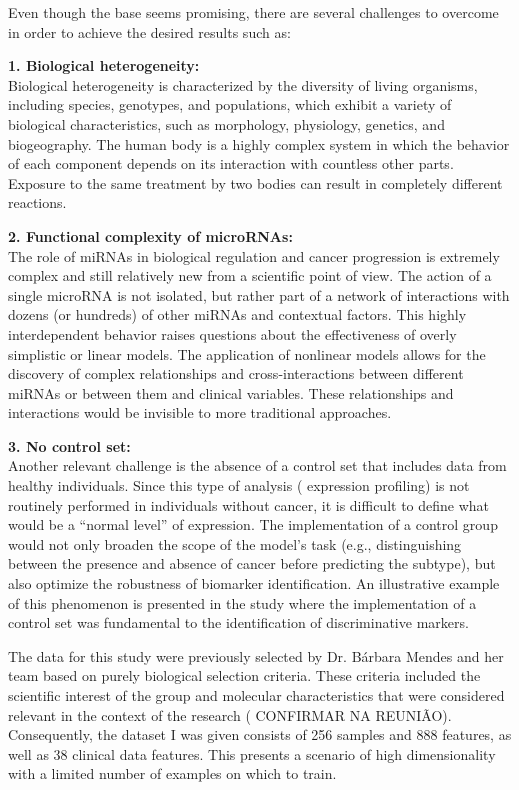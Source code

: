 Even though the base seems promising, there are several challenges to overcome
in order to achieve the desired results such as:

\textbf{1. Biological heterogeneity:} \\
\label{sec:biological-heterogeneity}
Biological heterogeneity is characterized by the diversity of living organisms,
including species, genotypes, and populations, which exhibit a variety of
biological characteristics, such as morphology, physiology, genetics, and biogeography.
The human body is a highly complex system in which the behavior of each
component depends on its interaction with countless other parts.
Exposure to the same treatment by two bodies can result in completely different
reactions.

\textbf{2. Functional complexity of microRNAs:} \\
The role of \gls{miRNAs} in biological regulation and cancer progression is
extremely complex and still relatively new from a scientific point of view.
The action of a single microRNA is not isolated, but rather part of a network
of interactions with dozens (or hundreds) of other \gls{miRNAs} and contextual
factors. This highly interdependent behavior raises questions about the
effectiveness of overly simplistic or linear models. The application of
nonlinear models allows for the discovery of complex relationships and
cross-interactions between different \gls{miRNAs} or between them and clinical
variables. These relationships and interactions would be invisible to more
traditional approaches.

\textbf{3. No control set:} \\
Another relevant challenge is the absence of a control set that includes data
from healthy individuals. Since this type of analysis ( expression
profiling) is not routinely performed in individuals without cancer, it is
difficult to define what would be a “normal level” of expression. The
implementation of a control group would not only broaden the scope of the
model's task (e.g., distinguishing between the presence and absence of cancer
before predicting the subtype), but also optimize the robustness of biomarker
identification. An illustrative example of this phenomenon is presented in the
study \textcite{ml_gastric_Azari2023} where the implementation of a control set
was fundamental to the identification of discriminative markers.

The data for this study were previously selected by Dr. Bárbara Mendes and her
team based on purely biological selection criteria. These criteria included the
scientific interest of the group and molecular characteristics that were
considered relevant in the context of the research ( CONFIRMAR NA REUNIÃO).
Consequently, the dataset I was given consists of 256 samples and 888
 features, as well as 38 clinical data features. This presents
a scenario of high dimensionality with a limited number of examples on which to
train.


